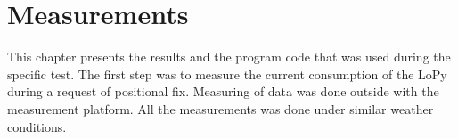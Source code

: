 


\chapter{Measurements}

 This chapter presents the results and the program code that was used during the  specific test. The first step was to measure the current consumption of the LoPy during a request of positional fix. Measuring of data was done outside with the measurement platform. All the measurements was done under similar weather conditions. 


